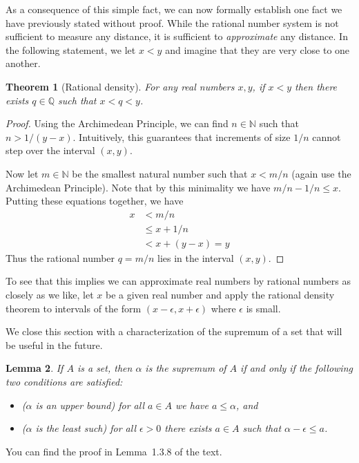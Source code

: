 \documentclass[11pt,oneside]{amsbook}
\newcommand{\N}{\mathbb N}
\newcommand{\Q}{\mathbb Q}
\theoremstyle{definition}
\theoremstyle{plain}
\newtheorem{theorem}{Theorem}[section]
\newtheorem{lemma}[theorem]{Lemma}
\theoremstyle{definition}
\theoremstyle{remark}
\numberwithin{equation}{section}
\numberwithin{figure}{section}
\begin{document}
As a consequence of this simple fact, we can now formally establish one fact we have previously stated without proof. While the rational number system is not sufficient to measure any distance, it is sufficient to \emph{approximate} any distance. In the following statement, we let $x<y$ and imagine that they are very close to one another.

\begin{theorem}[Rational density]
  For any real numbers $x,y$, if $x<y$ then there exists $q\in\Q$ such that $x<q<y$.
\end{theorem}

\begin{proof}
  Using the Archimedean Principle, we can find $n\in\N$ such that $n>1/(y-x)$. Intuitively, this guarantees that increments of size $1/n$ cannot step over the interval $(x,y)$.

  Now let $m\in\N$ be the smallest natural number such that $x<m/n$ (again use the Archimedean Principle). Note that by this minimality we have $m/n-1/n\leq x$. Putting these equations together, we have
\begin{align*}
  x&<m/n\\
   &\leq x+1/n\\
   &<x+(y-x)=y
\end{align*}
Thus the rational number $q=m/n$ lies in the interval $(x,y)$.
\end{proof}

To see that this implies we can approximate real numbers by rational numbers as closely as we like, let $x$ be a given real number and apply the rational density theorem to intervals of the form $(x-\epsilon,x+\epsilon)$ where $\epsilon$ is small.

We close this section with a characterization of the supremum of a set that will be useful in the future.

\begin{lemma}
  If $A$ is a set, then $\alpha$ is the supremum of $A$ if and only if the following two conditions are satisfied:
  \begin{itemize}
  \item ($\alpha$ is an upper bound) for all $a\in A$ we have $a\leq\alpha$, and
  \item ($\alpha$ is the least such) for all $\epsilon>0$ there exists $a\in A$ such that $\alpha-\epsilon\leq a$.
  \end{itemize}
\end{lemma}

You can find the proof in Lemma~1.3.8 of the text.
\end{document}
